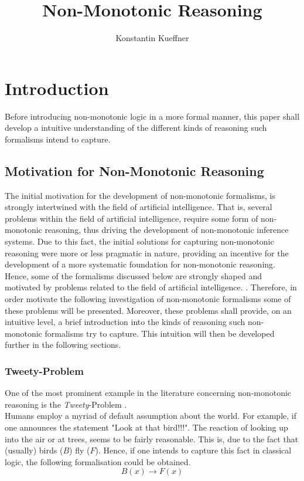 \documentclass{article}
\title{Non-Monotonic Reasoning}
\author{Konstantin Kueffner}
\begin{document}
\maketitle

\section{Introduction}

Before introducing non-monotonic logic in a more formal manner, this paper shall develop a intuitive understanding of the different kinds of reasoning such formalisms intend to capture.  


\subsection{Motivation for Non-Monotonic Reasoning}



The initial motivation for the development of non-monotonic formalisms, is strongly intertwined with the field of artificial intelligence. That is, several problems within the field of artificial intelligence, require some form of non-monotonic reasoning, thus driving the development of non-monotonic inference systems. Due to this fact, the initial solutions for capturing non-monotonic reasoning were more or less pragmatic in nature, providing an incentive for the development of a more systematic foundation for non-monotonic reasoning. Hence, some of the formalisms discussed below are strongly shaped and motivated by problems related to the field of artificial intelligence. \cite{BOCHMAN2007557}. Therefore, in order motivate the following investigation of non-monotonic formalisms some of these problems will be presented. 
Moreover, these problems shall provide, on an intuitive level, a brief introduction into the kinds of reasoning such non-monotonic formalisms try to capture. This intuition will then be developed further in the following sections.

\subsubsection*{Tweety-Problem}
One of the most prominent example in the literature concerning non-monotonic reasoning is the \emph{Tweety}-Problem \cite{reiter1980logic}.  \\

Humans employ a myriad of default assumption about the world. For example, if one announces the statement "Look at that bird!!!". The reaction of looking up into the air or at trees, seems to be fairly reasonable. This is, due to the fact that (usually) birds ($B$) fly ($F$). Hence, if one intends to capture this fact in classical logic, the following formalisation could be obtained. 
\begin{equation*}
B(x) \to F(x)
\end{equation*}
\end{document}
